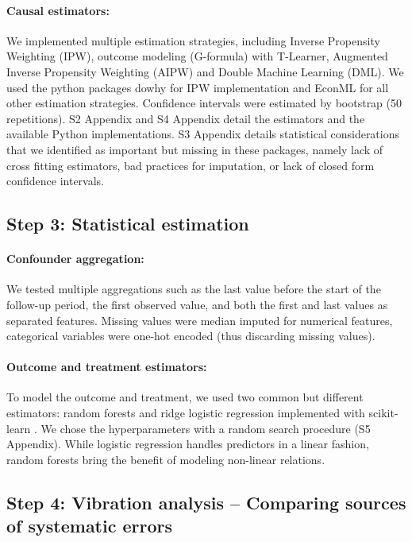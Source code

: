 \documentclass[10pt,letterpaper]{article}
\begin{document}
\paragraph{Causal estimators:}

We implemented multiple estimation strategies, including Inverse Propensity
Weighting (IPW), outcome modeling (G-formula) with T-Learner, Augmented Inverse
Propensity Weighting (AIPW) and Double Machine Learning (DML). We used the
python packages dowhy \cite{sharma2018tutorial} for IPW implementation and
EconML \cite{battocchi2019econml} for all other estimation strategies.
Confidence intervals were estimated by bootstrap (50 repetitions).
S2 Appendix and
S4 Appendix detail the estimators and the available Python
implementations. S3 Appendix details statistical considerations that we identified as important but missing in these packages, namely lack of cross fitting estimators, bad practices for imputation, or lack of closed form confidence intervals.

\subsection*{Step 3: Statistical estimation}\label{sec:estimation_mimic_iv}


\paragraph{Confounder aggregation:}

We tested multiple aggregations such as the last value before the start of the
follow-up period, the first observed value, and both the first and last values
as separated features. Missing values were median imputed for numerical
features, categorical variables were one-hot encoded (thus discarding missing values).


\paragraph{Outcome and treatment estimators:}

To model the outcome and treatment, we used two common but different
estimators: random forests and ridge logistic regression implemented with scikit-learn
\cite{pedregosa2011scikit}. We chose the
hyperparameters with a random search procedure (S5 Appendix). While logistic regression handles
predictors in a linear fashion, random forests bring the benefit of modeling
non-linear relations.


\subsection*{Step 4: Vibration analysis -- Comparing sources of systematic errors}%
\label{sec:vibration_analysis_mimic_iv}
\end{document}
